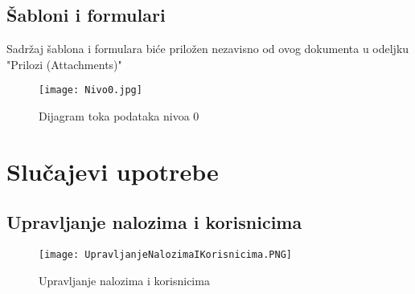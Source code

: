 \documentclass[a4paper]{article}
\begin{document}
\subsection{Šabloni i formulari}
Sadržaj šablona i formulara biće priložen nezavisno od ovog dokumenta u odeljku "Prilozi (Attachments)"



\begin{figure}[hbt!]
    \centering
    \texttt{[image: Nivo0.jpg]}
    \caption{Dijagram toka podataka nivoa 0}
    \label{fig:my_label}
\end{figure}

\section{Slučajevi upotrebe}

\subsection{Upravljanje nalozima i korisnicima}


\begin{figure}[hbt!]
    \centering
    \texttt{[image: UpravljanjeNalozimaIKorisnicima.PNG]}
    \caption{Upravljanje nalozima i korisnicima}
    \label{fig:my_label}
\end{figure}
\end{document}
